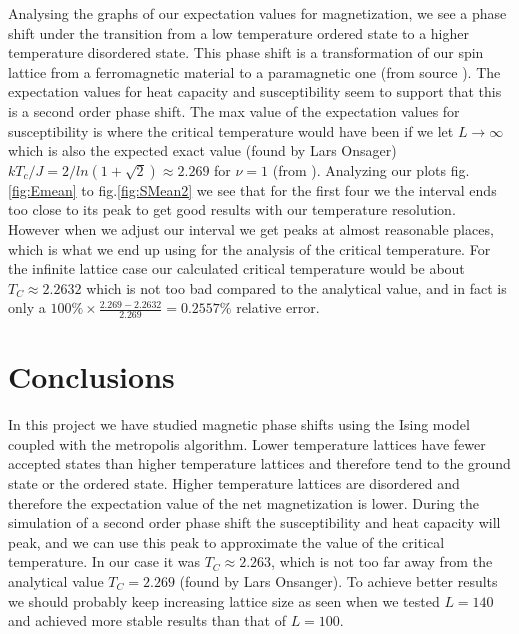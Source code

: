 \documentclass{emulateapj}
\begin{document}
%
\newline
\newline
Analysing the graphs of our expectation values for magnetization, we see a phase shift under the transition from a low temperature ordered state to a higher temperature disordered state. This phase shift is a transformation of our spin lattice from a ferromagnetic material to a paramagnetic one (from source \cite{bib:lecturenotes}). The expectation values for heat capacity and susceptibility seem to support that this is a second order phase shift.
%
\newline
\newline
The max value of the expectation values for susceptibility is where the critical temperature would have been if we let $L \rightarrow \infty$ which is also the expected exact value (found by Lars Onsager) $kT_{c}/J = 2/ln(1+\sqrt{2}) \approx 2.269$ for $\nu = 1$ (from \cite{bib:project4}). Analyzing our plots fig.\ref{fig:Emean} to fig.\ref{fig:SMean2} we see that for the first four we the interval ends too close to its peak to get good results with our temperature resolution. However when we adjust our interval we get peaks at almost reasonable places, which is what we end up using for the analysis of the critical temperature. For the infinite lattice case our calculated critical temperature would be about $T_C \approx 2.2632$ which is not too bad compared to the analytical value, and in fact is only a $100\% \times \frac{2.269-2.2632}{2.269} = 0.2557\%$ relative error.
%
\section{Conclusions}
\label{sec:conclusions}
In this project we have studied magnetic phase shifts using the Ising model coupled with the metropolis algorithm. Lower temperature lattices have fewer accepted states than higher temperature lattices and therefore tend to the ground state or the ordered state. Higher temperature lattices are disordered and therefore the expectation value of the net magnetization is lower. During the simulation of a second order phase shift the susceptibility and heat capacity will peak, and we can use this peak to approximate the value of the critical temperature. In our case it was $T_C \approx 2.263$, which is not too far away from the analytical value $T_C = 2.269$ (found by Lars Onsanger). To achieve better results we should probably keep increasing lattice size as seen when we tested $L=140$ and achieved more stable results than that of $L=100$.
\end{document}
